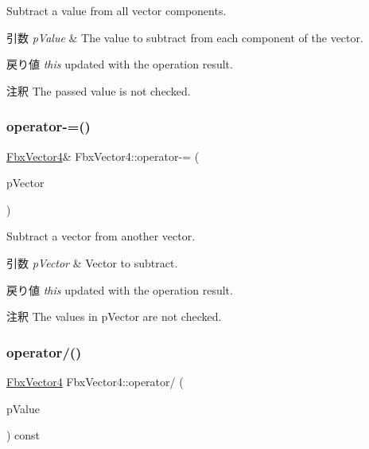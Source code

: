 Subtract a value from all vector components. 
\begin{DoxyParams}{引数}
{\em p\+Value} & The value to subtract from each component of the vector. \\
\hline
\end{DoxyParams}
\begin{DoxyReturn}{戻り値}
{\itshape this} updated with the operation result. 
\end{DoxyReturn}
\begin{DoxyRemark}{注釈}
The passed value is not checked. 
\end{DoxyRemark}
\mbox{\label{class_fbx_vector4_adbfdb7ee65fb83a6a489200e2a45f613}} 
\subsubsection{\texorpdfstring{operator-\/=()}{operator-=()}\hspace{0.1cm}{\footnotesize\ttfamily [2/2]}}
{\footnotesize\ttfamily \hyperlink{class_fbx_vector4}{Fbx\+Vector4}\& Fbx\+Vector4\+::operator-\/= (\begin{DoxyParamCaption}\item[{const \hyperlink{class_fbx_vector4}{Fbx\+Vector4} \&}]{p\+Vector }\end{DoxyParamCaption})}

Subtract a vector from another vector. 
\begin{DoxyParams}{引数}
{\em p\+Vector} & Vector to subtract. \\
\hline
\end{DoxyParams}
\begin{DoxyReturn}{戻り値}
{\itshape this} updated with the operation result. 
\end{DoxyReturn}
\begin{DoxyRemark}{注釈}
The values in p\+Vector are not checked. 
\end{DoxyRemark}
\mbox{\label{class_fbx_vector4_a202692980b2d21bc5089e3d31f40b543}} 
\subsubsection{\texorpdfstring{operator/()}{operator/()}\hspace{0.1cm}{\footnotesize\ttfamily [1/2]}}
{\footnotesize\ttfamily \hyperlink{class_fbx_vector4}{Fbx\+Vector4} Fbx\+Vector4\+::operator/ (\begin{DoxyParamCaption}\item[{double}]{p\+Value }\end{DoxyParamCaption}) const}


